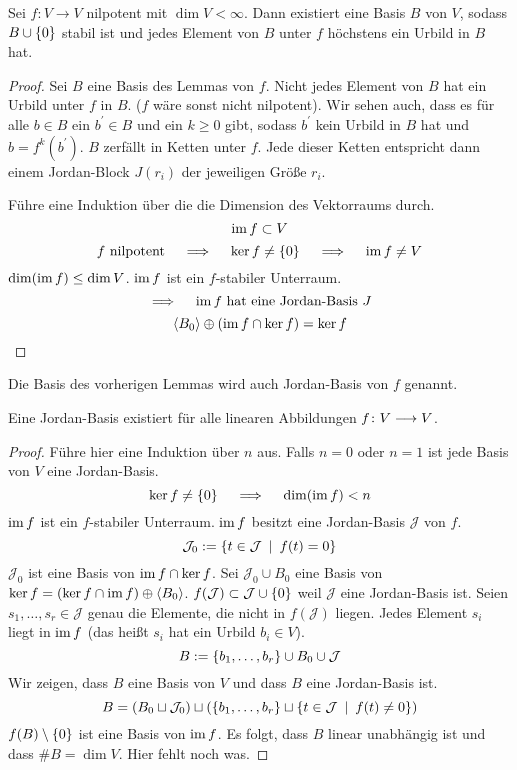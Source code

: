		\begin{lemma}
			Sei $f:V\longrightarrow V$ nilpotent mit $\dim V < \infty$.
			Dann existiert eine Basis $B$ von $V$, sodass $B\cup \left\{ 0 \right\}$ stabil ist und jedes Element von $B$ unter $f$ höchstens ein Urbild in $B$ hat.
		\end{lemma}
		\begin{proof}
			Sei $B$ eine Basis des Lemmas von $f$.
			Nicht jedes Element von $B$ hat ein Urbild unter $f$ in $B$.
			($f$ wäre sonst nicht nilpotent).
			Wir sehen auch, dass es für alle $b\in B$ ein $b^\prime\in B$ und ein $k\geq 0$ gibt, sodass $b^\prime$ kein Urbild in $B$ hat und $b=f^k(b^\prime)$.
			$B$ zerfällt in Ketten unter $f$.
			Jede dieser Ketten entspricht dann einem Jordan-Block $J(r_i)$ der jeweiligen Größe $r_i$.

			Führe eine Induktion über die die Dimension des Vektorraums durch.
			\[ \operatorname{im} f \subset V \]
			\[ f \text{ nilpotent} \quad \implies \quad \ker f \neq \left\{ 0 \right\} \quad \implies \quad \operatorname{im} f\neq V \]
			$\dim(\operatorname{im} f)\leq \dim V$.
			$\operatorname{im} f$ ist ein $f$-stabiler Unterraum.
			\[ \implies \quad \operatorname{im} f \text{ hat eine Jordan-Basis } J \]
			\[ \left\langle B_0 \right\rangle\oplus\left(  \operatorname{im} f \cap \ker f  \right) = \ker f \]
		\end{proof}

		\begin{definition}
			Die Basis des vorherigen Lemmas wird auch Jordan-Basis von $f$ genannt.
		\end{definition}

		\begin{lemma}
			Eine Jordan-Basis existiert für alle linearen Abbildungen $f\colon V \longrightarrow V$.
		\end{lemma}
		\begin{proof}
			Führe hier eine Induktion über $n$ aus.
			Falls $n=0$ oder $n=1$ ist jede Basis von $V$ eine Jordan-Basis.
			\[ \ker f \neq \left\{ 0 \right\} \quad \implies \quad \dim(\operatorname{im} f)<n \]
			$\operatorname{im} f$ ist ein $f$-stabiler Unterraum.
			$\operatorname{im} f$ besitzt eine Jordan-Basis $\mathcal{J}$ von $f$.
			\[ \mathcal{J}_0 := \left\{ t\in\mathcal{J} \enspace \middle\vert \enspace f(t)=0 \right\} \]
			$\mathcal{J}_0$ ist eine Basis von $ \operatorname{im} f \cap \ker f $.
			Sei $ \mathcal{J}_0 \cup B_0 $ eine Basis von $\ker f = (\ker f\cap \operatorname{im} f)\oplus\left\langle B_0 \right\rangle$.
			$f(\mathcal{J}) \subset \mathcal{J}\cup\left\{ 0 \right\} $ weil $\mathcal{J} $ eine Jordan-Basis ist.
			Seien $s_1,\ldots,s_r\in\mathcal{J}$ genau die Elemente, die nicht in $f(\mathcal{J})$ liegen.
			Jedes Element $s_i$ liegt in $\operatorname{im} f$ (das heißt $s_i$ hat ein Urbild $b_i\in V$).
			\[ B:= \left\{  b_1,\ldots,b_r  \right\}\cup B_0 \cup \mathcal{J} \]
			Wir zeigen, dass $B$ eine Basis von $V$ und dass $B$ eine Jordan-Basis ist.
			\[ B=(B_0 \sqcup \mathcal{J}_0)\sqcup \left(  \left\{ b_1,\ldots,b_r \right\}\sqcup \left\{ t\in\mathcal{J} \enspace \middle\vert \enspace  f(t)\neq 0  \right\}  \right) \]
			$f(B)\setminus \left\{ 0 \right\}$ ist eine Basis von $\operatorname{im} f$.
			Es folgt, dass $B$ linear unabhängig ist und dass $\#B=\dim V$.
			Hier fehlt noch was.
		\end{proof}

